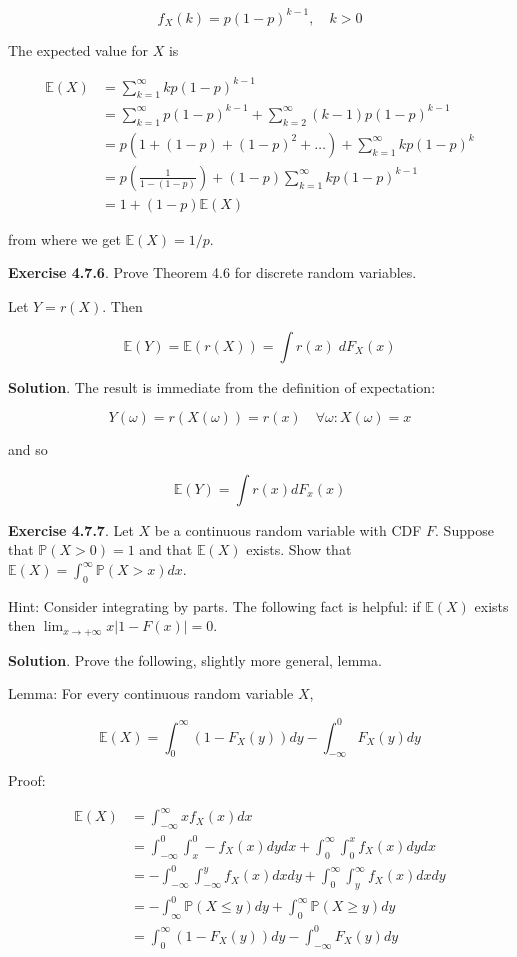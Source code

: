 \[ f_X(k) = p (1 - p)^{k - 1}, \quad k > 0 \]

The expected value for \(X\) is

\begin{align*}
\mathbb{E}(X) &= \sum_{k=1}^{\infty} k p (1 - p)^{k - 1}  \\
&= \sum_{k=1}^{\infty} p(1-p)^{k-1} + \sum_{k=2}^{\infty} (k - 1) p(1-p)^{k - 1} \\
&= p \left( 1 + (1 - p) + (1 - p)^{2} + \dots \right) + \sum_{k=1}^{\infty} k p(1-p)^{k} \\
&= p \left(\frac{1}{1 - (1 - p)}\right) + (1 - p) \sum_{k=1}^{\infty} k p(1-p)^{k - 1} \\
&= 1 + (1 - p) \mathbb{E}(X)
\end{align*}

from where we get \(\mathbb{E}(X) = 1 / p\).

\textbf{Exercise 4.7.6}. Prove Theorem 4.6 for discrete random
variables.

Let \(Y = r(X)\). Then

\[ \mathbb{E}(Y) = \mathbb{E}(r(X)) = \int r(x) \; dF_X(x) \]

\textbf{Solution}. The result is immediate from the definition of
expectation:

\[ Y(\omega) = r(X(\omega)) = r(x) \quad \forall \omega : X(\omega) = x \]

and so

\[ \mathbb{E}(Y) = \int r(x) dF_x(x) \]

\textbf{Exercise 4.7.7}. Let \(X\) be a continuous random variable with
CDF \(F\). Suppose that \(\mathbb{P}(X > 0) = 1\) and that
\(\mathbb{E}(X)\) exists. Show that
\(\mathbb{E}(X) = \int_{0}^{\infty} \mathbb{P}(X > x) dx\).

Hint: Consider integrating by parts. The following fact is helpful: if
\(\mathbb{E}(X)\) exists then
\(\lim_{x \rightarrow +\infty} x | 1 - F(x) | = 0\).

\textbf{Solution}. Prove the following, slightly more general,
lemma.

Lemma: For every continuous random variable \(X\),

\[ \mathbb{E}(X) = \int_{0}^{\infty} (1 - F_X(y)) dy - \int_{-\infty}^{0} F_X(y) dy \]

Proof:

\begin{align*}
\mathbb{E}(X) &= \int_{-\infty}^{\infty} x f_X(x) dx \\
&= \int_{-\infty}^{0} \int_x^{0} -f_X(x) dy dx + \int_{0}^{\infty} \int_{0}^x f_X(x) dy dx \\
&= -\int_{-\infty}^{0} \int_{-\infty}^y f_X(x) dx dy + \int_{0}^{\infty} \int_y^{\infty} f_X(x) dx dy \\
&= -\int_{\infty}^{0} \mathbb{P}(X \leq y) dy + \int_{0}^{\infty} \mathbb{P}(X \geq y) dy \\
&= \int_{0}^{\infty} (1 - F_X(y)) dy - \int_{-\infty}^{0} F_X(y) dy
\end{align*}

